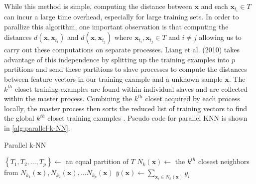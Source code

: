 While this method is simple, computing the distance between $\bm{x}$ and each $\bm{x}_{t_i} \in T$ can incur a large time overhead, especially for large training sets. In order to parallize this algorithm, one important observation is that computing the distances $d \left( \bm{x}, \bm{x}_{t_i} \right)$ and $d \left( \bm{x}, \bm{x}_{t_j} \right)$ where $\bm{x}_{t_i}, \bm{x}_{t_j} \in T$ and $i \neq j$ allowing us to carry out these computations on separate processes. Liang et al. (2010) takes advantage of this independence by splitting up the training examples into $p$ partitions and send these partitions to slave processes to compute the distances between feature vectors in our training example and a unknown sample $\bm{x}$. The $k^{th}$ closet training examples are found within individual slaves and are collected within the master process. Combining the $k^{th}$ closet acquired by each process locally, the master process then sorts the reduced list of training vectors to find the global $k^{th}$ closet training examples \cite{ShenshenLiang2010Daeo}. Pseudo code for parallel KNN is shown in \ref{alg:parallel-k-NN}.
\begin{algorithm}[h!!!]
\caption{Parallel k-NN}
\label{alg:parallel-k-NN}
\SetAlgoLined
    \BlankLine
    $\left\lbrace T_{1} , T_{2}, \ldots , T_{p} \right\rbrace \gets$ an equal partition of $T$\;
    $N_{k} (\bm{x}) \gets$ the $k^{th}$ closest neighbors from $N_{k_1} (\bm{x}), N_{k_2} (\bm{x}), \ldots N_{k_p} (\bm{x})$\;
    $\overline{y} \left( \bm{x} \right) \gets \sum_{\bm{x}_{i} \in N_{k} (\bm{x})} y_{i}$\;
    \BlankLine
\end{algorithm}


